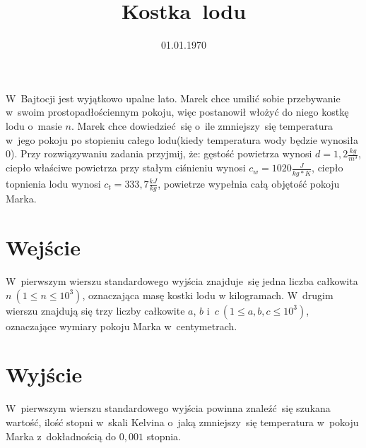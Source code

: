 \documentclass[zad]{soigstyl}
\date{01.01.1970}
\title{\mbox{Kostka lodu}}
\begin{document}
\begin{tasktext}%
    \noindent
    W~Bajtocji jest wyjątkowo upalne lato. Marek chce umilić sobie przebywanie w~swoim prostopadłościennym pokoju, więc postanowił włożyć do niego kostkę lodu o~masie $n$. Marek chce dowiedzieć~się o~ile zmniejszy~się temperatura w~jego pokoju po stopieniu całego lodu(kiedy temperatura wody będzie wynosiła $0$). Przy rozwiązywaniu zadania przyjmij, że: gęstość powietrza wynosi $d = 1,2 \frac{kg}{m^3}$, ciepło właściwe powietrza przy stałym ciśnieniu wynosi $c_w = 1020 \frac{J}{kg*K}$, ciepło topnienia lodu wynosi $c_t = 333,7 \frac{kJ}{kg}$, powietrze wypełnia całą objętość pokoju Marka.
	
    	\section{Wejście}
	W~pierwszym wierszu standardowego wyjścia znajduje~się jedna liczba całkowita $n~(1 \leqslant n \leqslant 10^3)$, oznaczająca masę kostki lodu w kilogramach. W~drugim wierszu znajdują się trzy liczby całkowite $a$, $b$ i~$c~(1\leqslant a, b, c \leqslant 10^3)$, oznaczające wymiary pokoju Marka w~centymetrach.

	\section{Wyjście}
	W~pierwszym wierszu standardowego wyjścia powinna znaleźć~się szukana wartość, ilość stopni w~skali Kelvina o~jaką zmniejszy~się temperatura w~pokoju Marka z~dokładnością do $0,001$ stopnia.
	
	\oigprzyklady
\end{tasktext}
\end{document}
